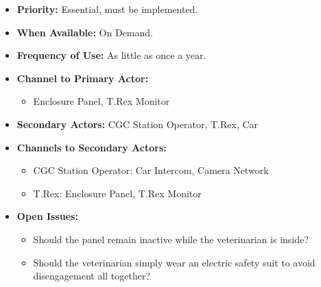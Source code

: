 \documentclass[12pt]{article}
\begin{document}
\begin{itemize}
        \item[]\textbf{Priority:}
            Essential, must be implemented.

        \item[]\textbf{When Available:}
            On Demand.

        \item[]\textbf{Frequency of Use:}
            As little as once a year.

        \item[]\textbf{Channel to Primary Actor:}
            \begin{itemize}
                \item[] Enclosure Panel, T.Rex Monitor
            \end{itemize}

        \item[]\textbf{Secondary Actors:}
            CGC Station Operator, T.Rex, Car
        
        \item[]\textbf{Channels to Secondary Actors:}
            \begin{itemize}
                \item[] CGC Station Operator: Car Intercom, Camera Network
                \item[] T.Rex: Enclosure Panel, T.Rex Monitor
            \end{itemize}

        \item[]\textbf{Open Issues:}
            \begin{itemize}
                \item[] Should the panel remain inactive while 
                the veterinarian is inside?
                \item[] Should the veterinarian simply wear an electric 
                safety suit to avoid disengagement all together?
            \end{itemize}
    \end{itemize}
    
\end{document}

